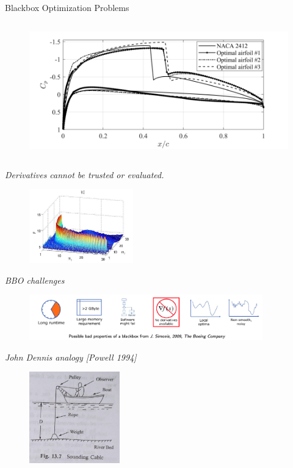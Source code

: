 \documentclass[8pt]{beamer}
\begin{document}
\begin{frame}[t]{Blackbox Optimization Problems}
{\begin{columns}[T]
\begin{column}{.5\textwidth}
\begin{figure}[H]
\includegraphics[width=1.1\textwidth]{Figures/Fig23-b.pdf}
\end{figure}
\end{column}
\hfill
\end{columns}
}

{
{\it Derivatives cannot be trusted or evaluated.}
\begin{figure}[H]
\includegraphics[width=0.4\textwidth]{Figures/noisy.jpeg}
\end{figure}
}

{
{\it BBO challenges}

\begin{figure}[H]
\includegraphics[width=0.9\textwidth]{Figures/BB_challenges.png}
\end{figure}

}
{
{\it John Dennis analogy [Powell 1994]}

\begin{figure}[H]
\includegraphics[width=0.35\textwidth]{Figures/fathom.jpeg}
\end{figure}

}
\end{frame}
\end{document}
